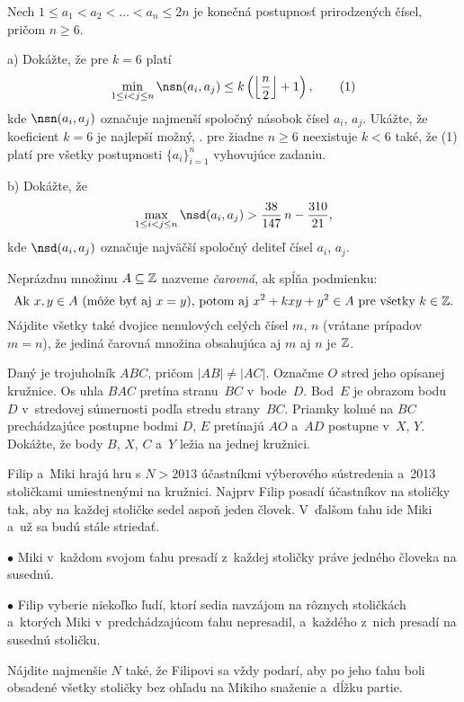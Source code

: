 {%
Nech $1\le a_1 < a_2 < \dots < a_n \le 2n$ je konečná postupnosť prirodzených čísel, pričom $n \ge 6$.
\item{a)}
Dokážte, že pre $k = 6$ platí
$$
\min_{1\le i < j \le n} \nsn(a_i, a_j) \le k \left( \left\lfloor \frac{n}{2}\right\rfloor + 1 \right),
\tag1
$$
kde $\nsn(a_i, a_j)$ označuje najmenší spoločný násobok čísel $a_i$, $a_j$.
Ukážte, že koeficient $k=6$ je najlepší možný, \tj.  pre žiadne $n\ge 6$ neexistuje $k < 6$ také, že (1) platí
pre všetky postupnosti $\{a_i\}_{i=1}^{n}$ vyhovujúce zadaniu.
\item{b)}
Dokážte, že
$$
\max_{1\le i < j \le n} \nsd(a_i, a_j) >  \frac{38}{147} \, n -  \frac{310}{21},
$$
kde $\nsd(a_i, a_j)$ označuje najväčší spoločný deliteľ čísel $a_i$, $a_j$.\endgraf
}

{%
Neprázdnu množinu $A\subseteq \Bbb Z$ nazveme {\it čarovná}, ak spĺňa podmienku:
$$
\text{Ak $x,y\in A$ (môže byť aj $x=y$), potom aj $x^2+kxy+y^2\in A$ pre všetky $k\in \Bbb Z$.}
$$
Nájdite všetky také dvojice nenulových celých čísel $m$, $n$ (vrátane prípadov $m=n$), že jediná čarovná množina obsahujúca aj $m$ aj $n$ je $\Bbb Z$.
}

{%
Daný je trojuholník $ABC$, pričom $|AB|\ne |AC|$. Označme $O$ stred jeho opísanej kružnice. Os uhla $BAC$ pretína stranu~$BC$ v~bode~$D$. Bod~$E$ je obrazom bodu~$D$ v~stredovej súmernosti podľa stredu strany~$BC$. Priamky kolmé na $BC$ prechádzajúce postupne bodmi $D$, $E$ pretínajú $AO$ a~$AD$ postupne v~$X$, $Y$. Dokážte, že body $B$, $X$, $C$ a~$Y$ ležia na jednej kružnici.
}

{%
Filip a~Miki hrajú hru s $N > 2013$ účastníkmi výberového sústredenia a~2013 stoličkami umiestnenými na kružnici.
Najprv Filip posadí účastníkov na stoličky tak, aby na každej stoličke sedel aspoň jeden človek. V~ďalšom ťahu ide Miki a~už sa budú stále striedať.
\item{$\bullet$} Miki v~každom svojom ťahu presadí z~každej stoličky práve jedného človeka na susednú.
\item{$\bullet$} Filip vyberie niekoľko ľudí, ktorí sedia navzájom na rôznych stoličkách a~ktorých Miki v~predchádzajúcom ťahu nepresadil, a~každého z~nich presadí na susednú stoličku.

Nájdite najmenšie $N$ také, že Filipovi sa vždy podarí, aby po jeho ťahu boli obsadené všetky stoličky bez ohľadu na Mikiho snaženie a~dĺžku partie.
}

